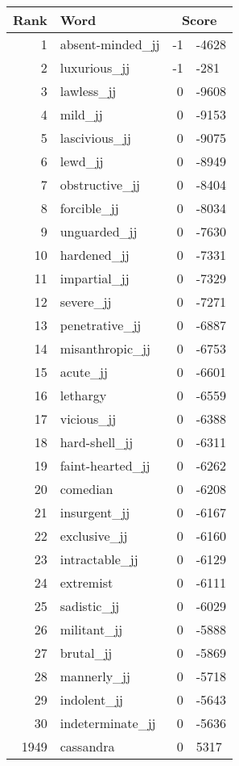 \begin{longtable}[!htbp]{| rlr@{.}l |}
    \hline
    \textbf{Rank} & \textbf{Word} & \multicolumn{2}{c|}{\textbf{Score}} \\
    \hline
    \endhead
    1 & absent-minded\_jj & -1 & -4628 \\
    2 & luxurious\_jj & -1 & -281 \\
    3 & lawless\_jj & 0 & -9608 \\
    4 & mild\_jj & 0 & -9153 \\
    5 & lascivious\_jj & 0 & -9075 \\
    6 & lewd\_jj & 0 & -8949 \\
    7 & obstructive\_jj & 0 & -8404 \\
    8 & forcible\_jj & 0 & -8034 \\
    9 & unguarded\_jj & 0 & -7630 \\
    10 & hardened\_jj & 0 & -7331 \\
    11 & impartial\_jj & 0 & -7329 \\
    12 & severe\_jj & 0 & -7271 \\
    13 & penetrative\_jj & 0 & -6887 \\
    14 & misanthropic\_jj & 0 & -6753 \\
    15 & acute\_jj & 0 & -6601 \\
    16 & lethargy & 0 & -6559 \\
    17 & vicious\_jj & 0 & -6388 \\
    18 & hard-shell\_jj & 0 & -6311 \\
    19 & faint-hearted\_jj & 0 & -6262 \\
    20 & comedian & 0 & -6208 \\
    21 & insurgent\_jj & 0 & -6167 \\
    22 & exclusive\_jj & 0 & -6160 \\
    23 & intractable\_jj & 0 & -6129 \\
    24 & extremist & 0 & -6111 \\
    25 & sadistic\_jj & 0 & -6029 \\
    26 & militant\_jj & 0 & -5888 \\
    27 & brutal\_jj & 0 & -5869 \\
    28 & mannerly\_jj & 0 & -5718 \\
    29 & indolent\_jj & 0 & -5643 \\
    30 & indeterminate\_jj & 0 & -5636 \\
    1949 & cassandra & 0 & 5317 \\

\end{longtable}
